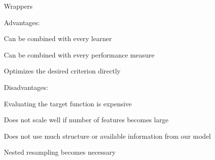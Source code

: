 \documentclass[11pt,compress,t,notes=noshow, xcolor=table]{beamer}
\begin{document}
  \begin{vbframe}{Wrappers}

    \begin{blocki}{Advantages:}
      \item Can be combined with every learner
      \item Can be combined with every performance measure
      \item Optimizes the desired criterion directly
    \end{blocki}

    \lz

    \begin{blocki}{Disadvantages:}
      \item Evaluating the target function is expensive
      \item Does not scale well if number of features becomes large
      \item Does not use much structure or available information from our model
      \item Nested resampling becomes necessary
    \end{blocki}

  \end{vbframe}


  \endlecture
\end{document}
